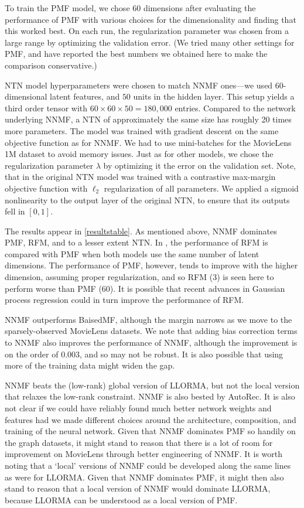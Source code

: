 \documentclass{article} \usepackage{iclr2016_conference,times}
\begin{document}
To train the PMF model, we chose 60 dimensions after evaluating the performance of PMF with various choices for the dimensionality and finding that this worked best.  On each run, the regularization parameter was chosen from a large range by optimizing the validation error.  (We tried many other settings for PMF, and have reported the best numbers we obtained here to make the comparison conservative.) 

NTN model hyperparameters were chosen to match NNMF ones---we used 60-dimensional latent features, and $50$ units in the hidden layer. This setup yields a third order tensor with $60 \times 60 \times 50 = 180,000$ entries. Compared to the network underlying NNMF, a NTN of approximately the same size has roughly 20 times more parameters. The model was trained with gradient descent on the same objective function as for NNMF. We had to use mini-batches for the MovieLens 1M dataset to avoid memory issues. Just as for other models, we chose the regularization parameter $\lambda$ by optimizing it the error on the validation set. Note, that in the original NTN model was trained with a contrastive max-margin objective function with $\ell_2$ regularization of all parameters. We applied a sigmoid nonlinearity to the output layer of the original NTN, to ensure that its outputs fell in $[0,1]$.

The results appear in \cref{resultstable}.  As mentioned above, NNMF dominates PMF, RFM, and to a lesser extent NTN.  In \citep{RFMLloyd}, the performance of RFM is compared with PMF when both models use the same number of latent dimensions.  The performance of PMF, however, tends to improve with the higher dimension, assuming proper regularization, and so RFM (3) is seen here to perform worse than PMF (60).  It is possible that recent advances in Gaussian process regression could in turn improve the performance of RFM.   

NNMF outperforms BaisedMF, although the margin narrows as we move to the sparsely-observed MovieLens datasets. We note that adding bias correction terms to NNMF also improves the performance of NNMF, although the improvement is on the order of $0.003$, and so may not be robust. It is also possible that using more of the training data might widen the gap.  

NNMF beats the (low-rank) global version of LLORMA, but not the local version that relaxes the low-rank constraint.  NNMF is also bested by AutoRec.    It is also not clear if we could have reliably found much better network weights and features had we made different choices around the architecture, composition, and training of the neural network.
Given that NNMF dominates PMF so handily on the graph datasets, it might stand to reason that there is a lot of room for improvement on MovieLens through better engineering of NNMF.  
It is worth noting that a `local' versions of NNMF could be developed along the same lines as were for LLORMA. Given that NNMF dominates PMF, it might then also stand to reason that a local version of NNMF would dominate LLORMA, because LLORMA can be understood as a local version of PMF.
\end{document}
